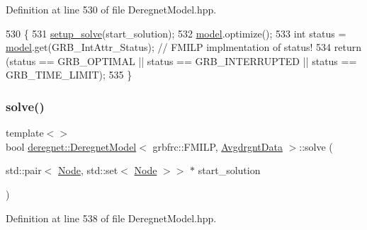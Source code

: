 Definition at line 530 of file Deregnet\+Model.\+hpp.


\begin{DoxyCode}
530                                                                                           \{
531     \hyperlink{classderegnet_1_1DeregnetModel_a502657403c84cbdc66ad845c56dee339}{setup\_solve}(start\_solution);
532     \hyperlink{classderegnet_1_1DeregnetModel_a30d525de2086e342b33fe3e45ede4947}{model}.optimize();
533     \textcolor{keywordtype}{int} status = \hyperlink{classderegnet_1_1DeregnetModel_a30d525de2086e342b33fe3e45ede4947}{model}.get(GRB\_IntAttr\_Status);   \textcolor{comment}{// FMILP implmentation of status!}
534     \textcolor{keywordflow}{return} (status == GRB\_OPTIMAL || status == GRB\_INTERRUPTED || status == GRB\_TIME\_LIMIT);
535 \}
\end{DoxyCode}
\mbox{\label{classderegnet_1_1DeregnetModel_a04b8bcc3b59819f10917a6cbb4dea487}} 
\subsubsection{\texorpdfstring{solve()}{solve()}\hspace{0.1cm}{\footnotesize\ttfamily [3/3]}}
{\footnotesize\ttfamily template$<$$>$ \\
bool \hyperlink{classderegnet_1_1DeregnetModel}{deregnet\+::\+Deregnet\+Model}$<$ grbfrc\+::\+F\+M\+I\+LP, \hyperlink{classderegnet_1_1AvgdrgntData}{Avgdrgnt\+Data} $>$\+::solve (\begin{DoxyParamCaption}\item[{std\+::pair$<$ \hyperlink{namespacederegnet_a744bad34f2de9856d36715a445f027f3}{Node}, std\+::set$<$ \hyperlink{namespacederegnet_a744bad34f2de9856d36715a445f027f3}{Node} $>$$>$ $\ast$}]{start\+\_\+solution }\end{DoxyParamCaption})\hspace{0.3cm}{\ttfamily [inline]}}



Definition at line 538 of file Deregnet\+Model.\+hpp.


